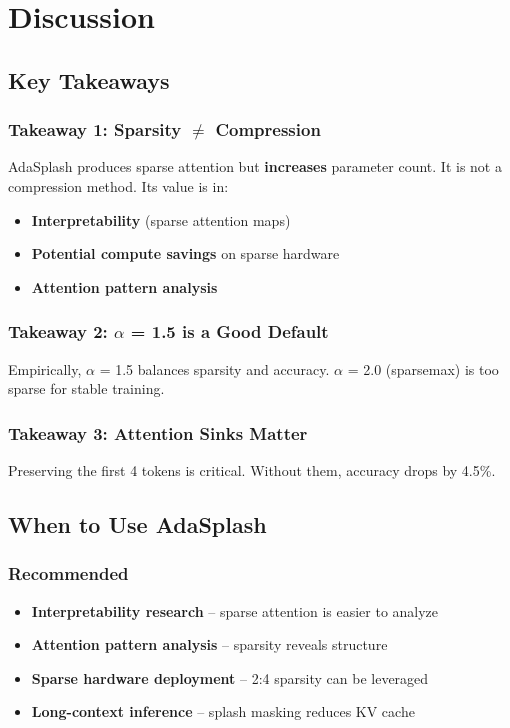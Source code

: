 
\section{Discussion}

\subsection{Key Takeaways}

\subsubsection{Takeaway 1: Sparsity $\ne$ Compression}

AdaSplash produces sparse attention but \textbf{increases} parameter count. 
It is not a compression method. Its value is in:
\begin{itemize}
\item \textbf{Interpretability} (sparse attention maps)
\item \textbf{Potential compute savings} on sparse hardware
\item \textbf{Attention pattern analysis}

\end{itemize}
\subsubsection{Takeaway 2: $\alpha$ = 1.5 is a Good Default}

Empirically, $\alpha$ = 1.5 balances sparsity and accuracy. $\alpha$ = 2.0 (sparsemax) 
is too sparse for stable training.

\subsubsection{Takeaway 3: Attention Sinks Matter}

Preserving the first 4 tokens is critical. Without them, accuracy drops by 
4.5\%.

\subsection{When to Use AdaSplash}

\subsubsection{Recommended}

\begin{itemize}
\item \textbf{Interpretability research} -- sparse attention is easier to analyze
\item \textbf{Attention pattern analysis} -- sparsity reveals structure
\item \textbf{Sparse hardware deployment} -- 2:4 sparsity can be leveraged
\item \textbf{Long-context inference} -- splash masking reduces KV cache

\end{itemize}
